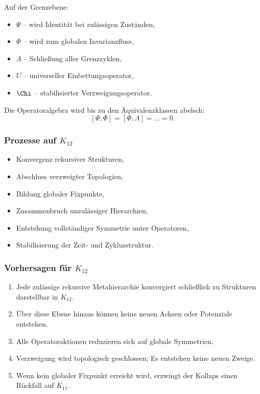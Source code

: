 Auf der Grenzebene:

\begin{itemize}
    \item $\Psi$ – wird Identität bei zulässigen Zuständen,
    \item $\Phi$ – wird zum globalen Invarianzfluss,
    \item $\Lambda$ – Schließung aller Grenzzyklen,
    \item $U$ – universeller Einbettungsoperator,
    \item $\Chi$ – stabilisierter Verzweigungsoperator.
\end{itemize}

Die Operatoralgebra wird bis zu den Äquivalenzklassen abelsch:
\[
[\Psi,\Phi]=[\Phi,\Lambda]=\dots = 0.
\]

\subsubsection{Prozesse auf $K_{12}$}

\begin{itemize}
    \item Konvergenz rekursiver Strukturen,
    \item Abschluss verzweigter Topologien,
    \item Bildung globaler Fixpunkte,
    \item Zusammenbruch unzulässiger Hierarchien,
    \item Entstehung vollständiger Symmetrie unter Operatoren,
    \item Stabilisierung der Zeit- und Zyklusstruktur.
\end{itemize}

\subsubsection{Vorhersagen für $K_{12}$}

\begin{enumerate}
    \item Jede zulässige rekursive Metahierarchie konvergiert schließlich zu
          Strukturen darstellbar in $K_{12}$.
    \item Über diese Ebene hinaus können keine neuen Achsen oder Potenziale entstehen.
    \item Alle Operatoraktionen reduzieren sich auf globale Symmetrien.
    \item Verzweigung wird topologisch geschlossen; Es entstehen keine neuen Zweige.
    \item Wenn kein globaler Fixpunkt erreicht wird, erzwingt der Kollaps einen Rückfall auf $K_{11}$.
\end{enumerate}

